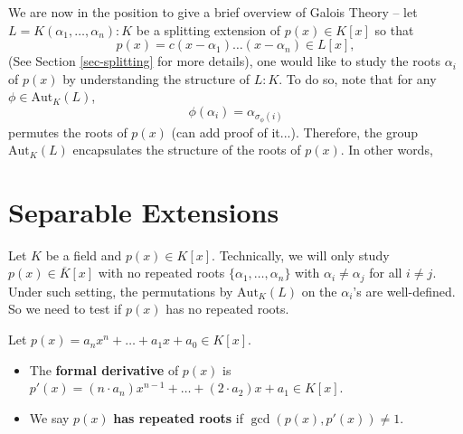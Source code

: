 \vspace{2mm}
We are now in the position to give a brief overview of Galois Theory -- let \(L = K(\alpha_1,\dots, \alpha_n) : K\) be a splitting extension of \(p(x) \in K[x]\) so that
\[
    p(x) = c(x - \alpha_1) \dots (x - \alpha_n) \in L[x],
\]
(See Section \ref{sec-splitting} for more details), one would like to study the roots $\alpha_i$ of $p(x)$ by understanding the structure of $L:K$. To do so, note that
for any \(\phi \in \mathrm{Aut}_K(L)\), 
$$\phi(\alpha_i) = \alpha_{\sigma_{\phi}(i)}$$
permutes the roots of $p(x)$ (can add proof of it...). Therefore, the group $\mathrm{Aut}_K(L)$ encapsulates the structure of the roots of $p(x)$. In other words,
\begin{center}
\end{center}

\section{Separable Extensions} \label{subsec-separable}
Let $K$ be a field and $p(x) \in K[x]$. Technically, we will only study $p(x) \in \overline{K}[x]$ with no repeated roots $\{\alpha_1, \dots, \alpha_n\}$ with $\alpha_i \neq \alpha_j$ for all $i \neq j$. Under such setting, the permutations by $\mathrm{Aut}_K(L)$ on the $\alpha_i$'s are well-defined.
So we need to test if $p(x)$ has no repeated roots.

\begin{definition} Let $p(x) = a_nx^n + \ldots + a_1x + a_0 \in K[x]$.
\begin{itemize}
    \item[(a)] The {\bf formal derivative} of $p(x)$ is $p'(x) = (n \cdot a_n)x^{n-1} + \dots + (2 \cdot a_2)x + a_1 \in K[x]$.
    \item[(b)] We say $p(x)$ {\bf has repeated roots} if $\gcd(p(x), p'(x)) \neq 1$.
\end{itemize}
\end{definition}

